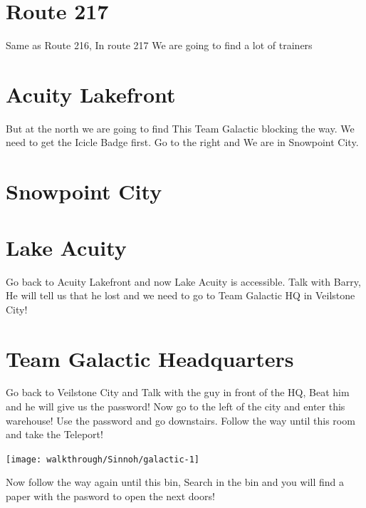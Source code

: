 \documentclass[11pt]{article}
\begin{document}



\section{Route 217}\label{sec:route-217}
Same as Route 216, In route 217 We are going to find a lot of trainers




\section{Acuity Lakefront}\label{sec:acuity-lakefront}
But at the north we are going to find This Team Galactic blocking the way.
We need to get the Icicle Badge first.
Go to the right and We are in Snowpoint City.




\section{Snowpoint City}\label{sec:snowpoint-city}

\section{Lake Acuity}\label{sec:lake-acuity}
Go back to Acuity Lakefront and now Lake Acuity is accessible.
Talk with Barry, He will tell us that
he lost and we need to go to Team Galactic HQ in Veilstone City!

\section{Team Galactic Headquarters}\label{sec:team-galactic-headquarters}
Go back to Veilstone City and Talk with the guy in front of the HQ,
Beat him and he will give us the password!
Now go to the left of the city and enter this warehouse!
Use the password and go downstairs.
Follow the way until this room and take the Teleport!

\texttt{[image: walkthrough/Sinnoh/galactic-1]}

Now follow the way again until this bin, Search in the bin and you will
find a paper with the pasword to open the next doors!
\end{document}
